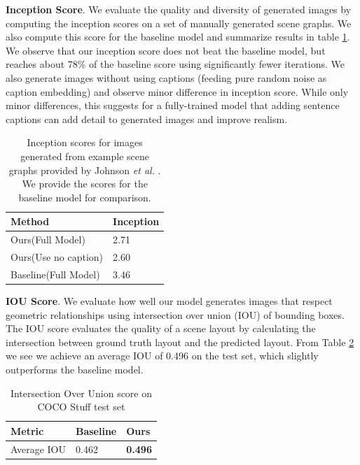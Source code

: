 \documentclass{article}
\begin{document}
\textbf{Inception Score}. We evaluate the quality and diversity of generated images by computing the inception scores on a set of manually generated scene graphs. We also compute this score for the baseline model and summarize results in table \ref{Example Context}. We observe that our inception score does not beat the baseline model, but reaches about 78\% of the baseline score using significantly fewer iterations. We also generate images without using captions (feeding pure random noise as caption embedding) and observe minor difference in inception score. While only minor differences, this suggests for a fully-trained model that adding sentence captions can add detail to generated images and improve realism.
\begin{table}[H]
    \centering
    \begin{tabular}{|l|l|}
    \hline
    Method               & Inception \\ \hline
    Ours(Full Model)     & 2.71     \\
    Ours(Use no caption) & 2.60      \\ \hline
    Baseline(Full Model) & 3.46       \\ \hline
    \end{tabular}
    \caption{Inception scores for images generated from example scene graphs provided by Johnson \textit{et al.} \cite{sg2im}. We provide the scores for the baseline model for comparison.}
    \label{Example Context}
\end{table}

\textbf{IOU Score}. We evaluate how well our model generates images that respect geometric relationships using intersection over union (IOU) of bounding boxes. The IOU score evaluates the quality of a scene layout by calculating the intersection between ground truth layout and the predicted layout. From Table \ref{IOU} we see we achieve an average IOU of 0.496 on the test set, which slightly outperforms the baseline model.
\begin{table}[H]
    \centering
    \begin{tabular}{|l|l|l|}
    \hline
    Metric      & Baseline & Ours           \\ \hline
    Average IOU & 0.462    & \textbf{0.496} \\ \hline
    \end{tabular}
    \caption{Intersection Over Union score on  COCO Stuff test set}
    \label{IOU}
\end{table}
\end{document}

